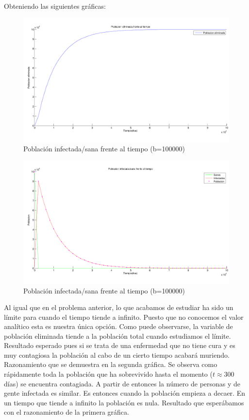 \documentclass[a4paper,11pt]{article}
\numberwithin{equation}{section}
\begin{document}
\indent Obteniendo las siguientes gráficas:
\begin{figure}[h!]
	\centering 		
	\includegraphics[width=1\textwidth]{grafica8.pdf}
	\caption{Población infectada/sana frente al tiempo (b=100000)}
	\label{Fig:8}
\end{figure}
\begin{figure}[h!]
	\centering 		
	\includegraphics[width=1\textwidth]{grafica9.pdf}
	\caption{Población infectada/sana frente al tiempo (b=100000)}
	\label{Fig:9}
\end{figure}

\newpage
\indent Al igual que en el problema anterior, lo que acabamos de estudiar ha sido un límite para cuando el tiempo tiende a infinito. Puesto que no conocemos el valor analítico esta es nuestra única opción. Como puede observarse, la variable de población eliminada tiende a la población total cuando estudiamos el límite. Resultado esperado pues si se trata de una enfermedad que no tiene cura y es muy contagiosa la población al cabo de un cierto tiempo acabará muriendo. Razonamiento que se demuestra en la segunda gráfica. Se observa como rápidamente toda la población que ha sobrevivido hasta el momento ($ t\approx 300 $ días) se encuentra contagiada. A partir de entonces la número de personas y de gente infectada es similar. Es entonces cuando la población empieza a decaer. En un tiempo que tiende a infinito la población es nula. Resultado que esperábamos con el razonamiento de la primera gráfica. \\
\end{document}
